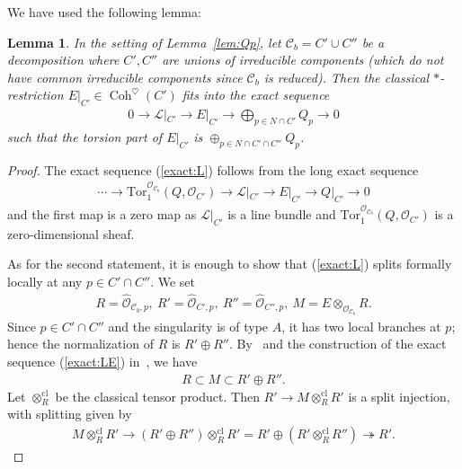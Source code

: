 \documentclass[11pt,oneside,a4paper,mathscr]{amsart}
\newtheorem{lemma}[thm]{Lemma}
\theoremstyle{definition}
\newcommand{\cC}{\mathcal{C}}
\newcommand{\cO}{\mathcal{O}}
\newcommand{\Coh}{\operatorname{Coh}}
\begin{document}
We have used the following lemma: 
\begin{lemma}\label{lem:torsion}
In the setting of Lemma~\ref{lem:Qp}, let $\cC_b=C'\cup C''$ be a decomposition 
where $C', C''$ are unions of irreducible components (which do not have common irreducible components since $\cC_b$ is reduced). Then 
the classical $*$-restriction $E|_{C'} \in \Coh^{\heartsuit}(C')$ fits into 
the exact sequence 
\begin{align}\label{exact:L}
    0\to \mathcal{L}|_{C'} \to E|_{C'} \to \bigoplus_{p\in N\cap C'}Q_p \to 0
\end{align}
such that the torsion part of $E|_{C'}$ is $\oplus_{p\in N\cap C'\cap C''}Q_p$. 
\end{lemma}
\begin{proof}
    The exact sequence (\ref{exact:L}) follows from the long exact sequence 
    \begin{align*}
        \cdots \to \mathrm{Tor}_1^{\mathcal{O}_{\cC_b}}(Q, \mathcal{O}_{C'}) \to 
        \mathcal{L}|_{C'} \to E|_{C'} \to Q|_{C'} \to 0
    \end{align*}
    and the first map is a zero map as $\mathcal{L}|_{C'}$ is a line bundle and 
    $ \mathrm{Tor}_1^{\mathcal{O}_{\cC_b}}(Q, \mathcal{O}_{C'})$ is a zero-dimensional sheaf. 

    As for the second statement, it is enough to show that (\ref{exact:L}) splits formally locally 
    at any $p\in C'\cap C''$. We set 
    \begin{align*}R=\widehat{\cO}_{\cC_b, p}, \ R'=\widehat{\cO}_{C', p}, \ 
    R''=\widehat{\cO}_{C'', p}, \ M=E\otimes_{\mathcal{O}_{\cC_b}}R.
    \end{align*}
    Since $p\in C'\cap C''$ and the singularity is of type $A$, it has two local branches at $p$; hence the normalization of $R$ is $R'\oplus R''$.
    By~\cite[Lemma~4.26]{TodaGL2} and the construction of the exact sequence (\ref{exact:LE}) in~\cite[Lemma~5.2]{TodaGL2}, we have 
    \begin{align*}
        R \subset M \subset R' \oplus R''.
    \end{align*}
    Let $\otimes_R^{\mathrm{cl}}$ be the classical tensor product. 
    Then $R' \to M\otimes_R^{\mathrm{cl}} R'$ is a split injection, with splitting given by 
    \begin{align*}
        M\otimes_R^{\mathrm{cl}} R' \to (R' \oplus R'')\otimes_R^{\mathrm{cl}} R'=R' \oplus (R' \otimes_R^{\mathrm{cl}} R'') \twoheadrightarrow R'.
    \end{align*}
\end{proof}
\end{document}
